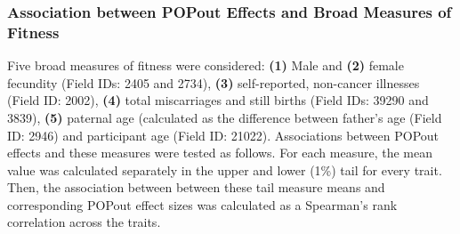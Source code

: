 \documentclass[12pt]{zHenriquesLab-StyleBioRxiv}
\begin{document}
{{\subsubsection*{Association between POPout Effects and Broad Measures of Fitness}
Five broad measures of fitness were considered: \textbf{(1)} Male and \textbf{(2)} female 
fecundity (Field IDs: 2405 and 2734), \textbf{(3)} self-reported, non-cancer illnesses 
(Field ID: 2002), \textbf{(4)} total miscarriages and still births (Field IDs: 39290 and 3839), 
\textbf{(5)} paternal age (calculated as the difference between father's age (Field ID: 2946) 
and participant age (Field ID: 21022). Associations between POPout effects and these 
measures were tested as follows. For each measure, the mean value was calculated 
separately in the upper and lower (1\%) tail for every trait. Then, the association between 
between these tail measure means and corresponding POPout effect sizes was 
calculated as a Spearman's rank correlation across the traits.




































\clearpage \newpage 






















































}}
\end{document}
